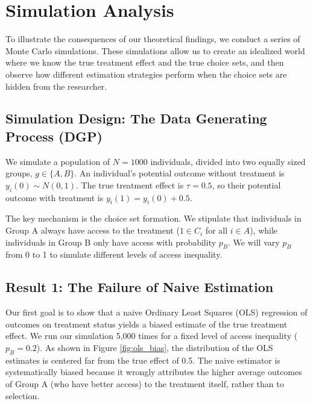 \section{Simulation Analysis}\label{sec:simulation}

To illustrate the consequences of our theoretical findings, we conduct a series of Monte Carlo simulations. These simulations allow us to create an idealized world where we know the true treatment effect and the true choice sets, and then observe how different estimation strategies perform when the choice sets are hidden from the researcher.

\subsection{Simulation Design: The Data Generating Process (DGP)}
We simulate a population of $N=1000$ individuals, divided into two equally sized groups, $g \in \{A, B\}$. An individual's potential outcome without treatment is $y_i(0) \sim N(0, 1)$. The true treatment effect is $\tau=0.5$, so their potential outcome with treatment is $y_i(1) = y_i(0) + 0.5$.

The key mechanism is the choice set formation. We stipulate that individuals in Group A always have access to the treatment ($1 \in C_i$ for all $i \in A$), while individuals in Group B only have access with probability $p_B$. We will vary $p_B$ from 0 to 1 to simulate different levels of access inequality.

\subsection{Result 1: The Failure of Naive Estimation}
Our first goal is to show that a naive Ordinary Least Squares (OLS) regression of outcomes on treatment status yields a biased estimate of the true treatment effect.
We run our simulation 5,000 times for a fixed level of access inequality ($p_B=0.2$). As shown in Figure \ref{fig:ols_bias}, the distribution of the OLS estimates is centered far from the true effect of 0.5. The naive estimator is systematically biased because it wrongly attributes the higher average outcomes of Group A (who have better access) to the treatment itself, rather than to selection.


